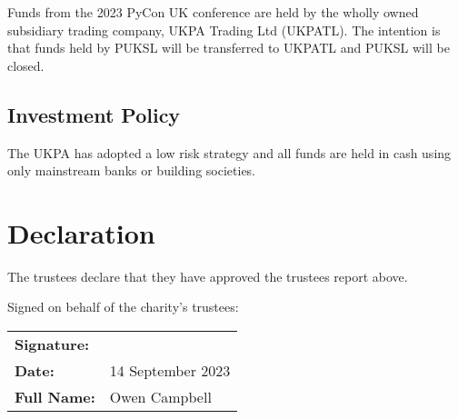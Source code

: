 \documentclass[11pt, final]{article}
\begin{document}
Funds from the 2023 PyCon UK conference are held by the wholly owned subsidiary trading company, UKPA Trading Ltd (UKPATL). The intention is that funds held by PUKSL will be transferred to UKPATL and PUKSL will be closed.

\subsection{Investment Policy}
The UKPA has adopted a low risk strategy and all funds are held in cash using only mainstream banks or building societies.

\section{Declaration}
The trustees declare that they have approved the trustees report above.


Signed on behalf of the charity's trustees:

\begin{tabular}{l l}
	\textbf{Signature:}\vspace{3cm}                       \\
	\textbf{Date:}      & 14 September 2023\vspace{1cm} \\
	\textbf{Full Name:} & Owen Campbell                   \\
\end{tabular}
\end{document}

